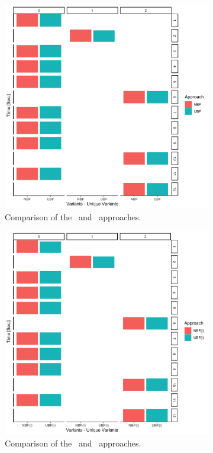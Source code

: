 \begin{figure}[!t]
\begin{subfigure}{.5\linewidth}
\centering
\includegraphics[width=.7\textwidth]{figs/plots/emp-nbf-ubf.png}
\caption[Comparison of the \nbf\ and \ubf\ approaches]{Comparison of the \nbf\ and \ubf\ approaches.}
\label{fig:emp-nbf-ubf}
\end{subfigure}%
\begin{subfigure}{.5\linewidth}
\centering
\includegraphics[width=.7\textwidth]{figs/plots/emp-nbfi-ubfi.png}
\caption[Comparison of the \nbfi\ and \ubfi\ approaches]{Comparison of the \nbfi\ and \ubfi\ approaches.}
\label{fig:emp-nbfi-ubfi}
\end{subfigure}\\[1ex]
\begin{subfigure}{0.5\linewidth}
\centering

\end{subfigure}
\end{figure}
